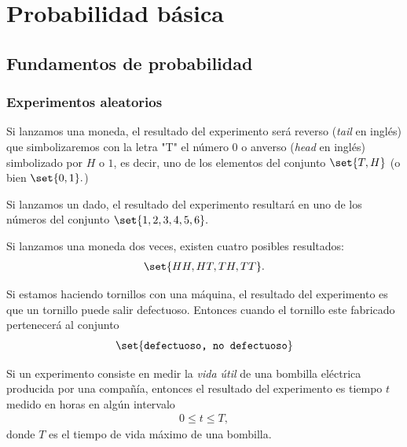 \chapter{Probabilidad básica}


\section{Fundamentos de probabilidad}

\subsection{Experimentos aleatorios}

 \begin{ejemplo}
  \label{exmp:1.1}
  Si lanzamos una moneda, el resultado del experimento será reverso (\emph{tail} en inglés) que simbolizaremos con la letra "T" el número $0$ o anverso (\emph{head} en inglés) simbolizado por $H$ o $1$, es decir, uno de los elementos del conjunto $\set{T,H}$ (o bien $\set{0,1}.$)
 \end{ejemplo}



 \begin{ejemplo}
  \label{exmp:1.2}
  Si lanzamos un dado, el resultado del experimento resultará en uno de los números del conjunto $\set{1,2,3,4,5,6}.$
 \end{ejemplo}



 \begin{ejemplo}
  \label{exmp:1.3}
  Si lanzamos una moneda dos veces, existen cuatro posibles resultados:
  \begin{align*}
   \set{HH,HT,TH,TT}.
  \end{align*}

 \end{ejemplo}



 \begin{ejemplo}
  \label{exmp:1.4}
  Si estamos haciendo tornillos con una máquina, el resultado del experimento es que un tornillo puede salir defectuoso. Entonces cuando el tornillo este fabricado pertenecerá al conjunto
  \begin{align*}
   \set{\texttt{defectuoso, no defectuoso}}
  \end{align*}

 \end{ejemplo}



 \begin{ejemplo}
  \label{exmp:1.5}
  Si un experimento consiste en medir la \emph{vida útil} de una bombilla eléctrica producida por una compañía, entonces el resultado del experimento es tiempo $t$ medido en horas en algún intervalo
  \begin{align*}
   0\leq t \leq T,
  \end{align*}
donde $T$ es el tiempo de vida máximo de una bombilla.
 \end{ejemplo}



